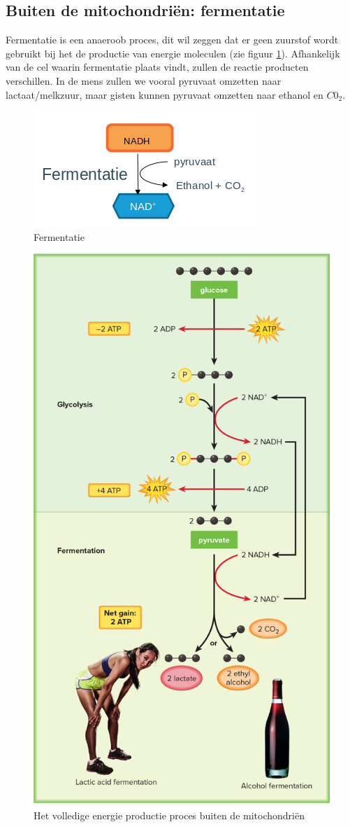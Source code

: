 \documentclass[a4paper,kul]{kulakarticle} %
\begin{document}
\subsection{Buiten de mitochondriën: fermentatie}
Fermentatie is een anaeroob proces, dit wil zeggen dat er geen zuurstof wordt gebruikt bij het de productie van energie moleculen (zie figuur \ref{fig:fermentatie}). Afhankelijk van de cel waarin fermentatie plaats vindt, zullen de reactie producten verschillen. In de mens zullen we vooral pyruvaat omzetten naar lactaat/melkzuur, maar gisten kunnen pyruvaat omzetten naar ethanol en $C0_2$. 
\begin{figure}[h]
	\centering
	\includegraphics[width=0.7\linewidth]{Fermentatie}
	\caption[Fermentatie]{Fermentatie}
	\label{fig:fermentatie}
\end{figure}
\begin{figure}[!h]
	\centering
	\includegraphics[width=0.7\linewidth]{BuitenEnergieProces}
	\caption[Buiten mitochondria]{Het volledige energie productie proces buiten de mitochondriën}
	\label{fig:buitenenergieproces}
\end{figure}
\newpage
\end{document}
